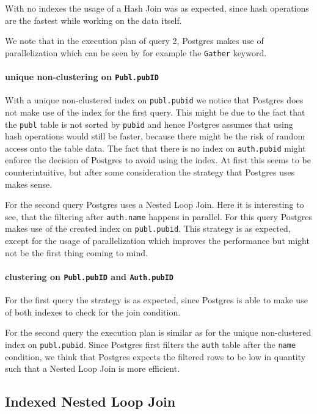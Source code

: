 \documentclass[11pt]{scrartcl}
\begin{document}
With no indexes the usage of a Hash Join was as expected, since hash operations are the fastest while working on the
data itself.

We note that in the execution plan of query 2, Postgres makes use of parallelization which can be seen by for example the
\texttt{Gather} keyword.

\paragraph{unique non-clustering on \texttt{Publ.pubID}}

With a unique non-clustered index on \texttt{publ.pubid} we notice that Postgres does not make use of the index for the
first query.
This might be due to the fact that the \texttt{publ} table is not sorted by \texttt{pubid} and hence Postgres assumes
that using hash operations would still be faster, because there might be the risk of random access onto the table data.
The fact that there is no index on \texttt{auth.pubid} might enforce the decision of Postgres to avoid using the index.
At first this seems to be counterintuitive, but after some consideration the strategy that Postgres uses makes sense.

For the second query Postgres uses a Nested Loop Join.
Here it is interesting to see, that the filtering after \texttt{auth.name} happens in parallel.
For this query Postgres makes use of the created index on \texttt{publ.pubid}.
This strategy is as expected, except for the usage of parallelization which improves the performance but might not be
the first thing coming to mind.

\paragraph{clustering on \texttt{Publ.pubID} and \texttt{Auth.pubID}}

For the first query the strategy is as expected, since Postgres is able to make use of both indexes to check for the
join condition.

For the second query the execution plan is similar as for the unique non-clustered index on \texttt{publ.pubid}.
Since Postgres first filters the \texttt{auth} table after the \texttt{name} condition, we think that Postgres
expects the filtered rows to be low in quantity such that a Nested Loop Join is more efficient.

\subsection*{Indexed Nested Loop Join}
\end{document}
